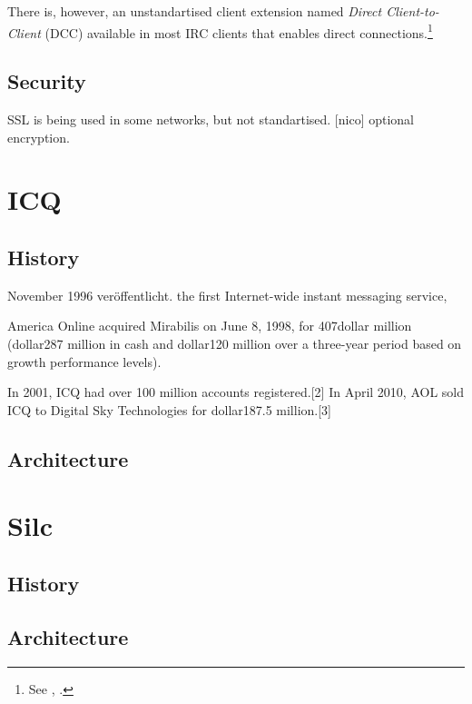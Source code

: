 There is, however, an unstandartised client extension named 
\textit{Direct Client-to-Client} (DCC) available in most IRC clients
that enables direct connections.\footnote{See \cite{dcc}, \cite{dcc2}.}

\subsection{Security}
SSL is being used in some networks, but not standartised. [nico]
optional encryption.
\section{ICQ}
\subsection{History}
November 1996 veröffentlicht.
 the first Internet-wide instant messaging service, 

America Online acquired Mirabilis on June 8, 1998, for 407dollar million (dollar287 million in cash and dollar120 million over a three-year period based on growth performance levels).

In 2001, ICQ had over 100 million accounts registered.[2] In April 2010, AOL sold ICQ to Digital Sky Technologies for dollar187.5 million.[3]

\subsection{Architecture}
\section{Silc}
\subsection{History}
\subsection{Architecture}
